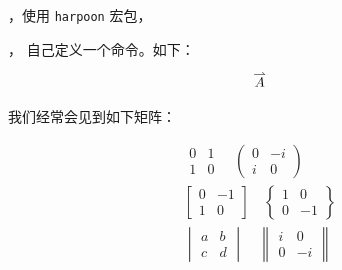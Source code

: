 

，使用 \verb|harpoon| 宏包，
\begin{example}
\end{example}



，
自己定义一个命令。如下：
\begin{example}
\newcommand{\myvec}[1]%
{\stackrel{\raisebox{-2pt}[0pt][0pt]
		{\small$\rightharpoonup$}}{#1}}
\[
	\myvec{A}
\]
\end{example}

我们经常会见到如下矩阵：
\begin{example}
\begin{gather*}
 \begin{matrix}  0 &  1 \\ 1 &  0 \end{matrix}\quad
 \begin{pmatrix} 0 & -i \\ i &  0 \end{pmatrix}\\
 \begin{bmatrix} 0 & -1 \\ 1 &  0 \end{bmatrix}\quad
 \begin{Bmatrix} 1 &  0 \\ 0 & -1 \end{Bmatrix}\\
 \begin{vmatrix} a &  b \\ c &  d \end{vmatrix}\quad
 \begin{Vmatrix} i &  0 \\ 0 & -i \end{Vmatrix}
\end{gather*}
\end{example}

